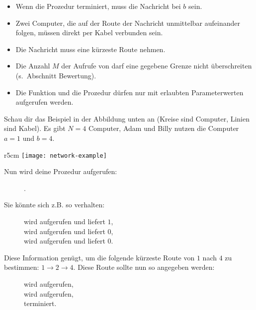 \documentclass{boi2014-de}
\begin{document}
    \begin{itemize}
        \item Wenn die Prozedur  terminiert, muss die Nachricht bei $b$ sein.
        \item Zwei Computer, die auf der Route der Nachricht unmittelbar aufeinander folgen, 
        müssen direkt per Kabel verbunden sein.
        \item Die Nachricht muss eine kürzeste Route nehmen.
        \item Die Anzahl $M$ der Aufrufe von  
        darf eine gegebene Grenze nicht überschreiten (s.~Abschnitt Bewertung).
        \item Die Funktion  und die Prozedur  
        dürfen nur mit erlaubten Parameterwerten aufgerufen werden.
    \end{itemize}

    \Example
    Schau dir das Beispiel in der Abbildung unten an (Kreise sind Computer, Linien sind Kabel).
    Es gibt $N = 4$ Computer, Adam und Billy nutzen die Computer $a = 1$ und $b = 4$.

    \begin{wrapfigure}[1]{r}{5cm}
        \texttt{[image: network-example]}
    \end{wrapfigure}

    Nun wird deine Prozedur  aufgerufen:
    \begin{figure}[H]
        \centering
        .
    \end{figure}

    Sie könnte sich z.B. so verhalten:

    \begin{figure}[H]
        \centering
         wird aufgerufen und liefert $1$, \\
         wird aufgerufen und liefert $0$, \\
         wird aufgerufen und liefert $0$.
    \end{figure}

    Diese Information genügt, um die folgende kürzeste Route von $1$ nach $4$ zu bestimmen:
    $1 \to 2 \to 4$.  Diese Route sollte nun so angegeben werden:

    \begin{figure}[H]
        \centering
         wird aufgerufen, \\
         wird aufgerufen, \\
         terminiert.
    \end{figure}
\end{document}
